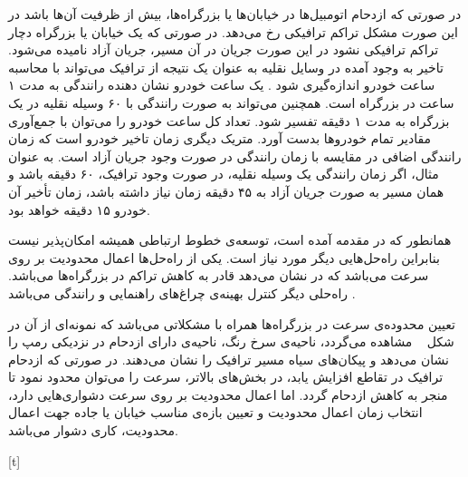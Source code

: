 

در صورتی که ازدحام اتومبیل‌ها در خیابان‌ها یا بزرگراه‌ها، بیش از ظرفیت آن‌ها باشد در این صورت مشکل تراکم ترافیکی رخ می‌دهد. در صورتی که یک خیابان یا بزرگراه دچار تراکم ترافیکی نشود در این صورت جریان در آن مسیر، جریان آزاد نامیده می‌شود.
تاخیر به وجود آمده در وسایل نقلیه به عنوان یک نتیجه از ترافیک می‌تواند با محاسبه ساعت خودرو اندازه‌گیری شود \cite{Jacob2006}. یک ساعت خودرو نشان دهنده رانندگی به مدت ۱ ساعت در بزرگراه است. همچنین می‌تواند به صورت رانندگی با ۶۰ وسیله نقلیه در یک بزرگراه به مدت ۱ دقیقه تفسیر شود. تعداد کل ساعت خودرو را می‌توان با جمع‌آوری مقادیر تمام خودرو‌ها بدست آورد. متریک دیگری زمان تاخیر خودرو است که زمان رانندگی اضافی در مقایسه با زمان رانندگی در صورت وجود جریان آزاد است. به عنوان مثال، اگر زمان رانندگی یک وسیله نقلیه، در صورت وجود ترافیک، ۶۰ دقیقه باشد و همان مسیر به صورت جریان آزاد به ۴۵ دقیقه زمان نیاز داشته باشد، زمان تأخیر آن خودرو ۱۵ دقیقه خواهد بود.

همانطور که در مقدمه آمده است، توسعه‌ی خطوط ارتباطی همیشه امکان‌پذیر نیست  بنابراین راه‌حل‌هایی دیگر مورد نیاز است. یکی از راه‌حل‌ها اعمال محدودیت بر روی سرعت می‌باشد که در \cite{Jacob2006} نشان می‌دهد قادر به کاهش تراکم در بزرگراه‌ها می‌باشد.
راه‌حلی دیگر کنترل بهینه‌ی چراغ‌های راهنمایی و رانندگی می‌باشد \cite{Wiering2000, Touhbi2017}.

تعیین محدوده‌ی سرعت در بزرگراه‌ها همراه با مشکلاتی می‌باشد که نمونه‌ای از آن در شکل ~ مشاهده می‌گردد، ناحیه‌ی سرخ رنگ، ناحیه‌ی دارای ازدحام در نزدیکی رمپ را نشان می‌دهد و پیکان‌های سیاه مسیر ترافیک را نشان می‌دهند. در صورتی که ازدحام ترافیک در تقاطع افزایش یابد، در بخش‌های بالاتر، سرعت را می‌توان محدود نمود تا منجر به کاهش ازدحام گردد.
اما اعمال محدودیت بر روی سرعت دشواری‌هایی دارد، انتخاب زمان اعمال محدودیت و تعیین بازه‌ی مناسب خیابان یا جاده جهت اعمال محدودیت، کاری دشوار می‌باشد. 

[t]






